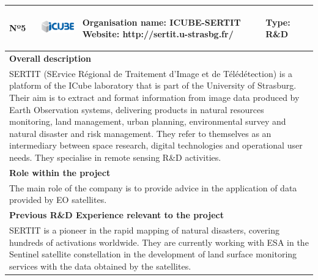 \begin{longtable}[H]{|p{0.7cm}|p{4cm}|p{7cm}|p{1.3cm}|}
	\hline
	\begin{center} Nº5 \end{center} & \begin{center} \includegraphics[scale=0.6]{./logos/Icube_web} \end{center} & \begin{center} \textbf{Organisation name:} ICUBE-SERTIT \newline \textbf{Website:} http://sertit.u-strasbg.fr/ \end{center} & \begin{center} Type: \newline R\&D \end{center} \\ \hline
	
	\multicolumn{4}{|p{13cm}|}{\textbf{Overall description}}  \\ \hline
	
	\multicolumn{4}{|p{14.5cm}|}{SERTIT (SErvice Régional de Traitement d'Image et de Télédétection) is a platform of the ICube laboratory that is part of the University of Strasburg. Their aim is to extract and format information from image data produced by Earth Observation systems, delivering products in natural resources monitoring, land management, urban planning, environmental survey and natural disaster and risk management. They refer to themselves as an intermediary between space research, digital technologies and operational user needs. They specialise in remote sensing R\&D activities.}  \\ \hline
	
	\multicolumn{4}{|p{13cm}|}{\textbf{Role within the project}}   \\ \hline
	
	\multicolumn{4}{|p{14.5cm}|}{The main role of the company is to provide advice in the application of data provided by EO satellites.}  \\ \hline
	
	\multicolumn{4}{|p{13cm}|}{\textbf{Previous R\&D Experience relevant to the project}}  \\ \hline
	
	\multicolumn{4}{|p{14.5cm}|}{SERTIT is a pioneer in the rapid mapping of natural disasters, covering hundreds of activations worldwide. They are currently working with ESA in the Sentinel satellite constellation in the development of land surface monitoring services with the data obtained by the satellites.}  \\ \hline
	

\end{longtable}
